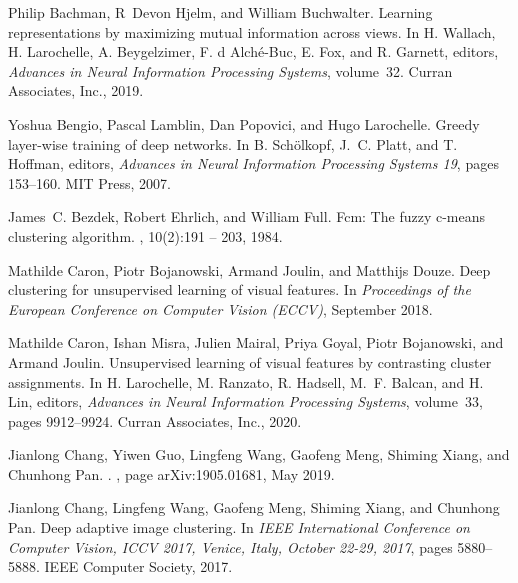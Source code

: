 \documentclass[journal]{IEEEtran}
\begin{document}
{\small

\begin{thebibliography}{10}\itemsep=-1pt

Philip Bachman, R~Devon Hjelm, and William Buchwalter.
\newblock Learning representations by maximizing mutual information across
  views.
\newblock In H. Wallach, H. Larochelle, A. Beygelzimer, F. d\textquotesingle
  Alch\'{e}-Buc, E. Fox, and R. Garnett, editors, {\em Advances in Neural
  Information Processing Systems}, volume~32. Curran Associates, Inc., 2019.

Yoshua Bengio, Pascal Lamblin, Dan Popovici, and Hugo Larochelle.
\newblock Greedy layer-wise training of deep networks.
\newblock In B. Sch\"{o}lkopf, J.~C. Platt, and T. Hoffman, editors, {\em
  Advances in Neural Information Processing Systems 19}, pages 153--160. MIT
  Press, 2007.

James~C. Bezdek, Robert Ehrlich, and William Full.
\newblock Fcm: The fuzzy c-means clustering algorithm.
, 10(2):191 -- 203, 1984.

Mathilde Caron, Piotr Bojanowski, Armand Joulin, and Matthijs Douze.
\newblock Deep clustering for unsupervised learning of visual features.
\newblock In {\em Proceedings of the European Conference on Computer Vision
  (ECCV)}, September 2018.

Mathilde Caron, Ishan Misra, Julien Mairal, Priya Goyal, Piotr Bojanowski, and
  Armand Joulin.
\newblock Unsupervised learning of visual features by contrasting cluster
  assignments.
\newblock In H. Larochelle, M. Ranzato, R. Hadsell, M.~F. Balcan, and H. Lin,
  editors, {\em Advances in Neural Information Processing Systems}, volume~33,
  pages 9912--9924. Curran Associates, Inc., 2020.

Jianlong {Chang}, Yiwen {Guo}, Lingfeng {Wang}, Gaofeng {Meng}, Shiming
  {Xiang}, and Chunhong {Pan}.
.
, page arXiv:1905.01681, May 2019.

Jianlong Chang, Lingfeng Wang, Gaofeng Meng, Shiming Xiang, and Chunhong Pan.
\newblock Deep adaptive image clustering.
\newblock In {\em {IEEE} International Conference on Computer Vision, {ICCV}
  2017, Venice, Italy, October 22-29, 2017}, pages 5880--5888. {IEEE} Computer
  Society, 2017.


\end{thebibliography}}
\end{document}
